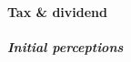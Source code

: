\documentclass[12pt]{article} %
\begin{document}
\paragraph{Tax \& dividend}

\subparagraph{Initial perceptions}

\end{document}

